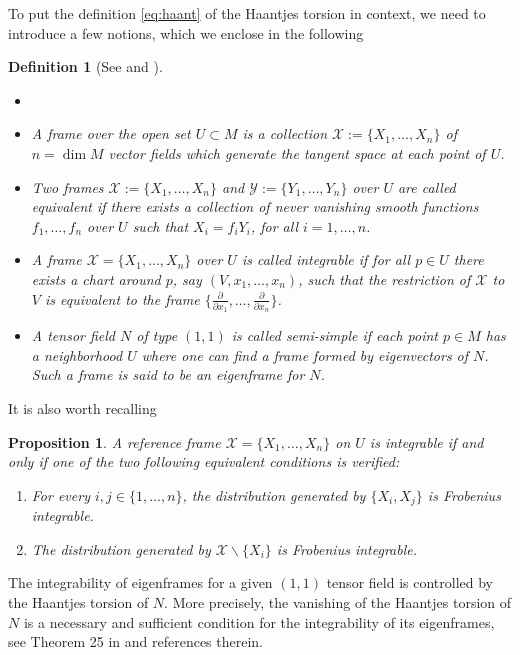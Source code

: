 \documentclass[12pt]{article}
\newtheorem{prop}[theorem]{Proposition}
\newtheorem{defi}[theorem]{Definition}
\begin{document}
To put the definition \eqref{eq:haant} of the Haantjes torsion in context, we need to introduce a few notions, which we enclose in the following 

\begin{defi}[See \cite{tempestatondo} and \cite{BenentiChanuRastelli}]
\begin{itemize}
\item[]
\item A frame over the open set $U\subset M$ is a collection ${\mathcal X}:=\{X_1,\dots,X_n\}$ of $n=\dim M$ vector fields which generate the tangent space at each point of $U$. 
\item Two frames $\mathcal X:=\{X_1,\dots,X_n\}$ and $\mathcal Y:=\{Y_1,\dots,Y_n\}$ over $U$ are called equivalent if there exists a collection of never vanishing smooth functions $f_1,\dots,f_n$ over $U$ such that $X_i=f_i Y_i$, for all $i=1,\dots,n$.
\item A %
frame $\mathcal X=\{X_1,\dots,X_n\}$ over $U$ is called integrable if for all $p\in U$ there exists a chart around $p$, 
say $(V,x_1,\dots,x_n)$, such that the restriction of $\mathcal X$ to $V$ is equivalent to the frame $\{\frac{\partial}{\partial x_1},\dots,\frac{\partial}{\partial x_n}\}$.
\item A tensor field $N$ of type $(1,1)$ is called semi-simple if each point $p\in M$ has a neighborhood $U$ where one can find a %
frame %
formed by eigenvectors of $N$. Such a frame is said to be an eigenframe for $N$.
\end{itemize}
\end{defi}

It is also worth recalling %
\begin{prop}%
A reference frame $\mathcal X=\{X_1,\dots,X_n\}$ on $U$ is integrable if and only if one of the two following equivalent conditions is verified:
\begin{enumerate}
\item For every $i,j\in\{1,\dots,n\}$, the distribution generated by $\{X_i,X_j\}$ is Frobenius integrable.
\item The distribution generated by $\mathcal X\backslash\{X_i\}$ is Frobenius integrable.
\end{enumerate}
\end{prop}

The integrability of eigenframes for a given $(1,1)$ tensor field is controlled by the Haantjes torsion of $N$. 
More precisely, the vanishing of the Haantjes torsion of $N$ is a necessary and sufficient condition for the integrability of its eigenframes, see Theorem 25 in \cite{tempestatondo} and references therein. 
\end{document}
